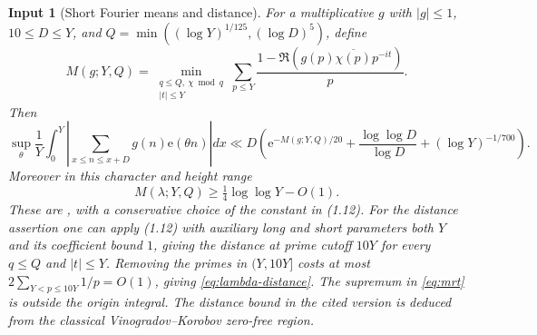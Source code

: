 \documentclass[11pt]{article}
\newtheorem{inputthm}[theorem]{Input}
\theoremstyle{definition}
\newcommand{\e}{\mathrm e}
\theoremstyle{remark}
\numberwithin{equation}{section}
\begin{document}
\begin{inputthm}[Short Fourier means and distance]\label{input:mrt}
For a multiplicative $g$ with $|g|\le1$, $10\le D\le Y$, and
$Q=\min((\log Y)^{1/125},(\log D)^5)$, define
\begin{equation}\label{eq:pretentious}
 M(g;Y,Q)=\min_{\substack{q\le Q,\ \chi\bmod q\\|t|\le Y}}
 \sum_{p\le Y}\frac{1-\Re(g(p)\overline{\chi(p)}p^{-it})}p.
\end{equation}
Then
\begin{equation}\label{eq:mrt}
 \sup_\theta\frac1Y\int_0^Y
 \left|\sum_{x\le n\le x+D}g(n)\e(\theta n)\right|dx
 \ll D\left(\e^{-M(g;Y,Q)/20}+\frac{\log\log D}{\log D}+(\log Y)^{-1/700}\right).
\end{equation}
Moreover in this character and height range
\begin{equation}\label{eq:lambda-distance}
 M(\lambda;Y,Q)\ge\tfrac14\log\log Y-O(1).
\end{equation}
These are \cite[Theorem~1.7 and (1.12), p.~6]{MRT}, with a conservative choice of the constant in (1.12).
For the distance assertion one can apply (1.12) with auxiliary long and short parameters both $Y$ and its
coefficient bound $1$, giving the distance at prime cutoff $10Y$ for every $q\le Q$ and $|t|\le Y$.
Removing the primes in $(Y,10Y]$ costs at most $2\sum_{Y<p\le10Y}1/p=O(1)$, giving \eqref{eq:lambda-distance}.
The supremum in \eqref{eq:mrt} is outside the origin integral. The distance bound in the cited version is deduced
from the classical Vinogradov--Korobov zero-free region.
\end{inputthm}
\end{document}
